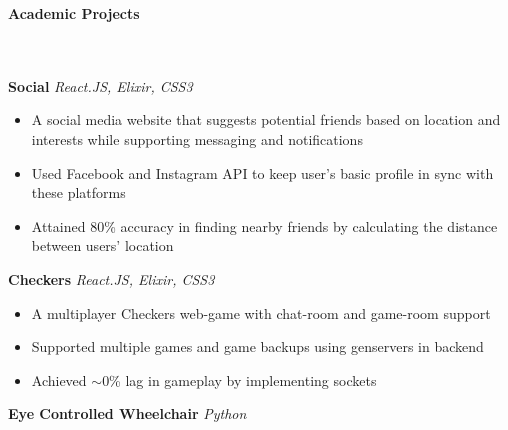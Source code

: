 \documentclass[]{article}
\newcommand{\lineunder} {
    \vspace*{-8pt} \\
    \hrulefill \\
}
\newcommand{\header} [1] {
    {\vspace*{6pt} \fontsize{12}{12}\selectfont \textbf{#1}}
     \lineunder
}
\begin{document}

\header{Academic Projects}
{\hspace{2mm}\textbf{Social}} {\sl React.JS, Elixir, CSS3} \\
\vspace{-2mm}
\begin{itemize}
        \setlength\itemsep{0.2mm}
        \item A social media website that suggests potential friends based on location and
        interests while supporting messaging and notifications
        \item Used Facebook and Instagram API to keep user's basic profile in sync with these platforms
        \item Attained 80\% accuracy in finding nearby friends by calculating the distance between users' location
\end{itemize}
{\hspace{2mm}\textbf{Checkers}} {\sl React.JS, Elixir, CSS3} \\
\begin{itemize}
        \setlength\itemsep{0.2mm}
        \item A multiplayer Checkers web-game with chat-room and game-room support
        \item Supported multiple games and game backups using genservers in backend
        \item Achieved $\sim$0\% lag in gameplay by implementing sockets
\end{itemize}
{\hspace{2mm}\textbf{Eye Controlled Wheelchair}} {\sl Python} \\
\end{document}
